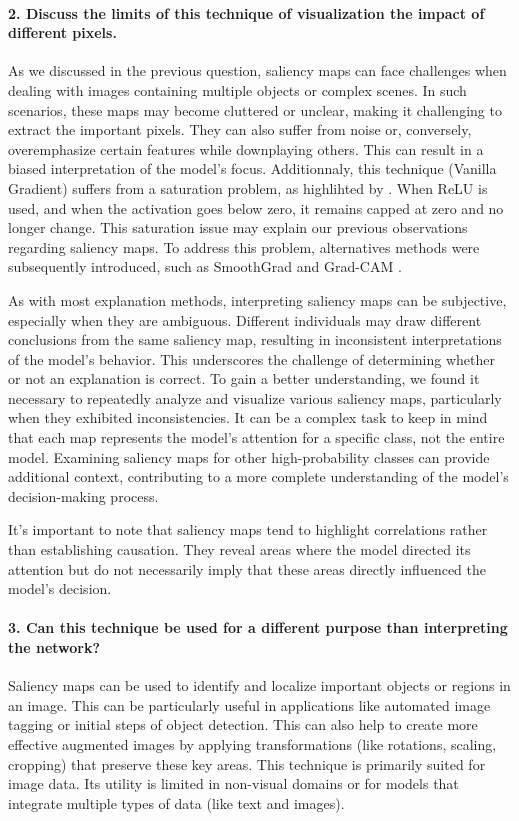 \paragraph*{2. Discuss the limits of this technique of visualization the impact of different pixels.}
As we discussed in the previous question, saliency maps can face challenges when dealing with images containing multiple objects or complex scenes. In such scenarios, these maps may become cluttered or unclear, making it challenging to extract the important pixels. They can also suffer from noise or, conversely, overemphasize certain features while downplaying others. This can result in a biased interpretation of the model's focus. Additionnaly, this technique (Vanilla Gradient) suffers from a saturation problem, as highlihted by \cite{shrikumar2019learning}. When ReLU is used, and when the activation goes below zero, it remains capped at zero and no longer change. This saturation issue may explain our previous observations regarding saliency maps. To address this problem, alternatives methods were subsequently introduced, such as SmoothGrad \citep{smilkov2017smoothgrad} and Grad-CAM \citep{Selvaraju_2019}.

As with most explanation methods, interpreting saliency maps can be subjective, especially when they are ambiguous. Different individuals may draw different conclusions from the same saliency map, resulting in inconsistent interpretations of the model's behavior. This underscores the challenge of determining whether or not an explanation is correct. To gain a better understanding, we found it necessary to repeatedly analyze and visualize various saliency maps, particularly when they exhibited inconsistencies. It can be a complex task to keep in mind that each map represents the model's attention for a specific class, not the entire model. Examining saliency maps for other high-probability classes can provide additional context, contributing to a more complete understanding of the model's decision-making process. 

It's important to note that saliency maps tend to highlight correlations rather than establishing causation. They reveal areas where the model directed its attention but do not necessarily imply that these areas directly influenced the model's decision.

\paragraph*{3. Can this technique be used for a different purpose than interpreting the network?}
Saliency maps can be used to identify and localize important objects or regions in an image. This can be particularly useful in applications like automated image tagging or initial steps of object detection. This can also  help to create more effective augmented images by applying transformations (like rotations, scaling, cropping) that preserve these key areas. This technique is primarily suited for image data. Its utility is limited in non-visual domains or for models that integrate multiple types of data (like text and images).

